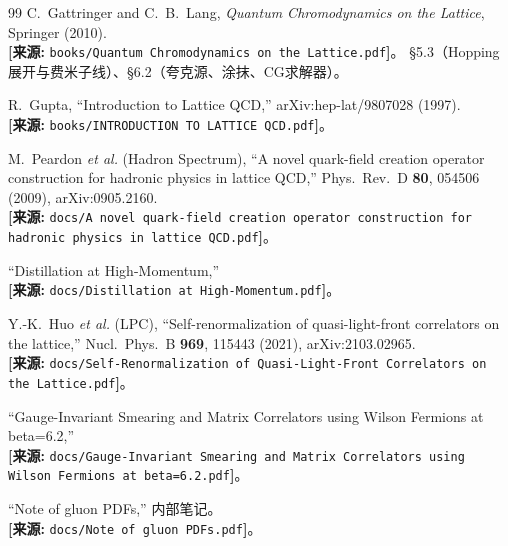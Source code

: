 \documentclass[12pt,a4paper]{ctexart}
\theoremstyle{definition}
\begin{document}
\begin{thebibliography}{99}
C.~Gattringer and C.~B.~Lang,
\textit{Quantum Chromodynamics on the Lattice}, Springer (2010).
\\\textbf{[来源:} \texttt{books/Quantum Chromodynamics on the Lattice.pdf}\textbf{]}。
§5.3（Hopping展开与费米子线）、§6.2（夸克源、涂抹、CG求解器）。

R.~Gupta, ``Introduction to Lattice QCD,'' arXiv:hep-lat/9807028 (1997).
\\\textbf{[来源:} \texttt{books/INTRODUCTION TO LATTICE QCD.pdf}\textbf{]}。

M.~Peardon \textit{et al.} (Hadron Spectrum),
``A novel quark-field creation operator construction for hadronic physics in lattice QCD,''
Phys.\ Rev.\ D \textbf{80}, 054506 (2009), arXiv:0905.2160.
\\\textbf{[来源:} \texttt{docs/A novel quark-field creation operator construction for hadronic physics in lattice QCD.pdf}\textbf{]}。

``Distillation at High-Momentum,''
\\\textbf{[来源:} \texttt{docs/Distillation at High-Momentum.pdf}\textbf{]}。

Y.-K.~Huo \textit{et al.} (LPC),
``Self-renormalization of quasi-light-front correlators on the lattice,''
Nucl.\ Phys.\ B \textbf{969}, 115443 (2021), arXiv:2103.02965.
\\\textbf{[来源:} \texttt{docs/Self-Renormalization of Quasi-Light-Front Correlators on the Lattice.pdf}\textbf{]}。

``Gauge-Invariant Smearing and Matrix Correlators using Wilson Fermions at beta=6.2,''
\\\textbf{[来源:} \texttt{docs/Gauge-Invariant Smearing and Matrix Correlators using Wilson Fermions at beta=6.2.pdf}\textbf{]}。

``Note of gluon PDFs,'' 内部笔记。
\\\textbf{[来源:} \texttt{docs/Note of gluon PDFs.pdf}\textbf{]}。
\end{thebibliography}
\end{document}

